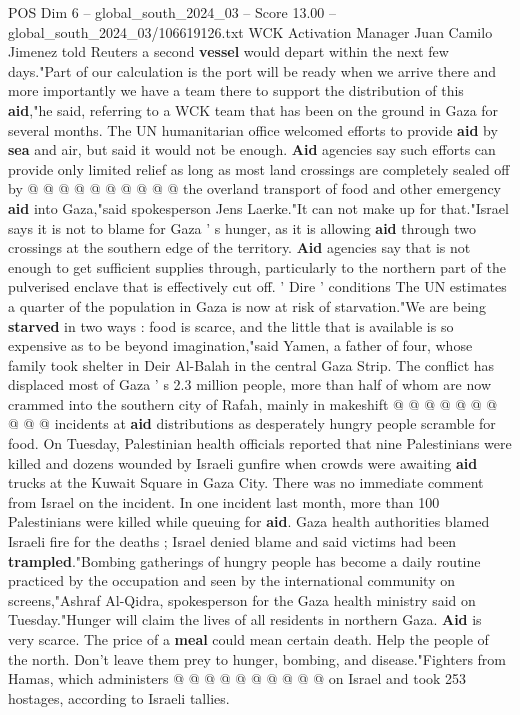 \begin{textsample}{POS Dim 6 – global\_south\_2024\_03 – Score 13.00 – global\_south\_2024\_03/106619126.txt}
WCK Activation Manager Juan Camilo Jimenez told Reuters a second \textbf{vessel} would depart within the next few days."Part of our calculation is the port will be ready when we arrive there and more importantly we have a team there to support the distribution of this \textbf{aid},"he said, referring to a WCK team that has been on the ground in Gaza for several months.
The UN humanitarian office welcomed efforts to provide \textbf{aid} by \textbf{sea} and air, but said it would not be enough. \textbf{Aid} agencies say such efforts can provide only limited relief as long as most land crossings are completely sealed off by @ @ @ @ @ @ @ @ @ @ the overland transport of food and other emergency \textbf{aid} into Gaza,"said spokesperson Jens Laerke."It can not make up for that."Israel says it is not to blame for Gaza ' s hunger, as it is allowing \textbf{aid} through two crossings at the southern edge of the territory. \textbf{Aid} agencies say that is not enough to get sufficient supplies through, particularly to the northern part of the pulverised enclave that is effectively cut off. ' Dire ' conditions The UN estimates a quarter of the population in Gaza is now at risk of starvation."We are being \textbf{starved} in two ways : food is scarce, and the little that is available is so expensive as to be beyond imagination,"said Yamen, a father of four, whose family took shelter in Deir Al-Balah in the central Gaza Strip.
The conflict has displaced most of Gaza ' s 2.3 million people, more than half of whom are now crammed into the southern city of Rafah, mainly in makeshift @ @ @ @ @ @ @ @ @ @ incidents at \textbf{aid} distributions as desperately hungry people scramble for food.
On Tuesday, Palestinian health officials reported that nine Palestinians were killed and dozens wounded by Israeli gunfire when crowds were awaiting \textbf{aid} trucks at the Kuwait Square in Gaza City.
There was no immediate comment from Israel on the incident.
In one incident last month, more than 100 Palestinians were killed while queuing for \textbf{aid}.
Gaza health authorities blamed Israeli fire for the deaths ; Israel denied blame and said victims had been \textbf{trampled}."Bombing gatherings of hungry people has become a daily routine practiced by the occupation and seen by the international community on screens,"Ashraf Al-Qidra, spokesperson for the Gaza health ministry said on Tuesday."Hunger will claim the lives of all residents in northern Gaza. \textbf{Aid} is very scarce.
The price of a \textbf{meal} could mean certain death.
Help the people of the north.
Don't leave them prey to hunger, bombing, and disease."Fighters from Hamas, which administers @ @ @ @ @ @ @ @ @ @ on Israel and took 253 hostages, according to Israeli tallies.

\end{textsample}
